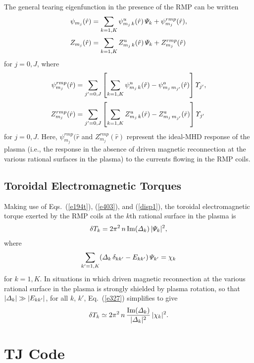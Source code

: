 \documentclass[12pt,prb,aps]{revtex4-1}
\begin{document}
The general tearing eigenfunction in the presence of the RMP can be written
\begin{align}
\psi_{m_j}(\hat{r})&= \sum_{k=1,K}\psi^u_{m_j\,k}(\hat{r})\,{\mit\Psi}_k +\psi_{m_j}^{rmp}(\hat{r}),\\[0.5ex]
Z_{m_j}(\hat{r})&= \sum_{k=1,K}Z^u_{m_j\,k}(\hat{r})\,{\mit\Psi}_k +Z_{m_j}^{rmp}(\hat{r})
\end{align}
for $j=0,J$, where
\begin{align}
\psi^{rmp}_{m_j}(\hat{r}) &= \sum_{j'=0,J}\left[\sum_{k=1,K}\psi_{m_j\,k}^u(\hat{r}) - \psi_{m_j\,m_{j'}}^a(\hat{r})\right]{\mit\Upsilon}_{j'},\\[0.5ex]
Z^{rmp}_{m_j}(\hat{r}) &= \sum_{j'=0,J}\left[\sum_{k=1,K}Z_{m_j\,k}^u(\hat{r}) - Z_{m_j\,m_{j'}}^a(\hat{r})\right]{\mit\Upsilon}_{j'}
\end{align}
for $j=0,J$. 
Here, $\psi^{rmp}_{m_j}(\hat{r}$ and $Z^{rmp}_{m_j}(\hat{r})$ represent the ideal-MHD response of the plasma (i.e., the response in the absence of
driven magnetic reconnection at the various rational surfaces in the plasma)  to the currents flowing in the RMP coils. 

\subsection{Toroidal Electromagnetic Torques}\label{troq}
Making use of Eqs.~(\ref{e194t}), (\ref{e403}), and (\ref{disp1}),  the toroidal electromagnetic torque exerted by the RMP coils at the $k$th rational
surface in the plasma is 
\begin{equation}\label{e327}
\delta T_k = 2\pi^2\,n\,{\rm Im}({\mit\Delta}_k)\,|{\mit\Psi}_k|^2,
\end{equation}
where
\begin{equation}
\sum_{k'=1,K}({\mit\Delta}_k\,\delta_{kk'}-E_{kk'})\,{\mit\Psi}_{k'} = \chi_k
\end{equation}
for $k=1,K$. In situations in which driven magnetic reconnection at the various rational surface in the plasma is
strongly shielded by plasma rotation,\cite{am3,rfa} so that $|{\mit\Delta}_k|\gg |E_{kk'}|$, for all $k$, $k'$, Eq.~(\ref{e327}) simplifies to give
\begin{equation}
\delta T_k\simeq 2\pi^2\,n\,\frac{{\rm Im}({\mit\Delta}_k)}{|{\mit\Delta}_k|^2}\,|{\mit\chi}_k|^2.
\end{equation}

\iffalse
\section{TJ Code}\label{tj}
\end{document}
